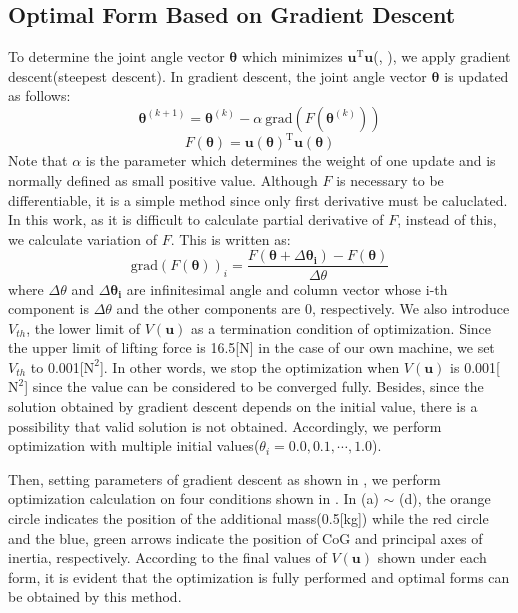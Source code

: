 \subsection{Optimal Form Based on Gradient Descent}
To determine the joint angle vector $\bm{\theta}$ which minimizes $\bm{u}^\mathrm{T}\bm{u}$(, ), we apply gradient descent(steepest descent)\cite{OZEKI2003}. In gradient descent, the joint angle vector $\bm{\theta}$ is updated as follows:
\begin{equation}
  \bm{\theta}^{(k+1)} = \bm{\theta}^{(k)}-\alpha \ \text{grad}(F(\bm{\theta}^{(k)}))
  \label{eq:steepest_descent_method}
\end{equation}
\begin{equation*}
  F(\bm{\theta})=\bm{u}(\bm{\theta})^\mathrm{T}\bm{u}(\bm{\theta})
\end{equation*}
Note that $\alpha$ is the parameter which determines the weight of one update and is normally defined as small positive value. Although $F$ is necessary to be differentiable, it is a simple method since only first derivative must be caluclated. In this work, as it is difficult to calculate partial derivative of $F$, instead of this, we calculate variation of $F$. This is written as:
\begin{equation}
  \text{grad}(F(\bm{\theta}))_i=\frac{F(\bm{\theta}+\Delta \bm{\theta_i})-F(\bm{\theta})}{\Delta \theta}
  \label{eq:grad}
\end{equation}
where $\Delta \theta$ and $\Delta \bm{\theta_i}$ are infinitesimal angle and column vector whose i-th component is $\Delta \theta$ and the other components are 0, respectively. We also introduce $V_{th}$, the lower limit of $V(\bm{u})$ as a termination condition of optimization. Since the upper limit of lifting force is 16.5[N] in the case of our own machine, we set $V_{th}$ to 0.001[$\text{N}^2$]. In other words, we stop the optimization when $V(\bm{u})$ is 0.001[$\text{N}^2$] since the value can be considered to be converged fully. Besides, since the solution obtained by gradient descent depends on the initial value, there is a possibility that valid solution is not obtained. Accordingly, we perform optimization with multiple initial values($\theta_i = 0.0, 0.1, \cdots, 1.0$). 
\par
Then, setting parameters of gradient descent as shown in , we perform optimization calculation on four conditions shown in . In (a) $\sim$ (d), the orange circle indicates the position of the additional mass(0.5[kg]) while the red circle and the blue, green arrows indicate the position of CoG and principal axes of inertia, respectively. According to the final values of $V(\bm{u})$ shown under each form, it is evident that the optimization is fully performed and optimal forms can be obtained by this method.

